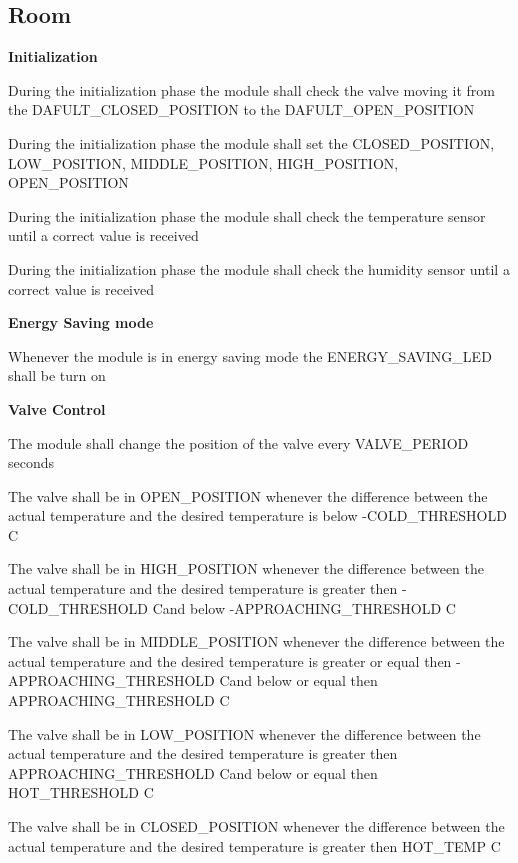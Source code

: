 	\subsection{Room}
		\begin{req_enum}
			\item \textbf{Initialization}
				\begin{req_enum}[label*=\arabic*.]
					\item During the initialization phase the module shall check the valve moving it from the DAFULT\_CLOSED\_POSITION to the DAFULT\_OPEN\_POSITION
					\item During the initialization phase the module shall set the CLOSED\_POSITION, LOW\_POSITION, MIDDLE\_POSITION, HIGH\_POSITION, OPEN\_POSITION
					\item During the initialization phase the module shall check the temperature sensor until a correct value is received
					\item During the initialization phase the module shall check the humidity sensor until a correct value is received
				\end{req_enum}
		
			\item \textbf{Energy Saving mode}
				\begin{req_enum}[label*=\arabic*.]
					\item Whenever the module is in energy saving mode the ENERGY\_SAVING\_LED shall be turn on
				\end{req_enum}

			\item \textbf{Valve Control}
				\begin{req_enum}[label*=\arabic*.]
					\item The module shall change the position of the valve every VALVE\_PERIOD seconds
					\item The valve shall be in OPEN\_POSITION whenever the difference between the actual temperature and the desired temperature is below -COLD\_THRESHOLD C\degree
					\item The valve shall be in HIGH\_POSITION whenever the difference between the actual temperature and the desired temperature is greater then -COLD\_THRESHOLD C\degree and below -APPROACHING\_THRESHOLD C\degree
					\item The valve shall be in MIDDLE\_POSITION whenever the difference between the actual temperature and the desired temperature is greater or equal then -APPROACHING\_THRESHOLD C\degree and below or equal then APPROACHING\_THRESHOLD C\degree
					\item The valve shall be in LOW\_POSITION whenever the difference between the actual temperature and the desired temperature is greater then APPROACHING\_THRESHOLD C\degree and below or equal then HOT\_THRESHOLD C\degree
					\item The valve shall be in CLOSED\_POSITION whenever the difference between the actual temperature and the desired temperature is greater then HOT\_TEMP C\degree
				\end{req_enum}


\end{req_enum}
